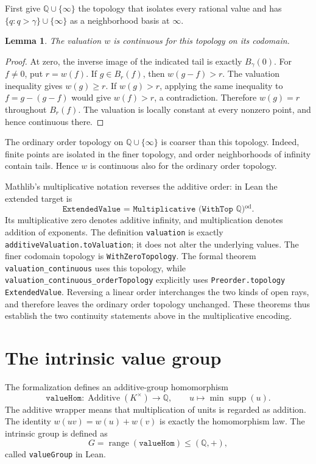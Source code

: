 \documentclass[11pt]{article}
\newtheorem{lemma}{Lemma}
\newcommand{\Q}{\mathbb{Q}}
\begin{document}
First give $\Q\cup\{\infty\}$ the topology that isolates every rational value and has
$\{q:q>\gamma\}\cup\{\infty\}$ as a neighborhood basis at $\infty$.

\begin{lemma}
The valuation $w$ is continuous for this topology on its codomain.
\end{lemma}
\begin{proof}
At zero, the inverse image of the indicated tail is exactly $B_\gamma(0)$.
For $f\ne0$, put $r=w(f)$. If $g\in B_r(f)$, then $w(g-f)>r$.
The valuation inequality gives $w(g)\geq r$. If $w(g)>r$, applying the same inequality to
$f=g-(g-f)$ would give $w(f)>r$, a contradiction. Therefore $w(g)=r$ throughout
$B_r(f)$. The valuation is locally constant at every nonzero point, and hence continuous there.
\end{proof}

The ordinary order topology on $\Q\cup\{\infty\}$ is coarser than this topology.
Indeed, finite points are isolated in the finer topology, and order neighborhoods of infinity
contain tails. Hence $w$ is continuous also for the ordinary order topology.

Mathlib's multiplicative notation reverses the additive order: in Lean the extended target is
\[
 \texttt{ExtendedValue = Multiplicative (WithTop $\Q$)$^{\mathrm{od}}$}.
\]
Its multiplicative zero denotes additive infinity, and multiplication denotes addition of
exponents. The definition \texttt{valuation} is exactly
\texttt{additiveValuation.toValuation}; it does not alter the underlying values.
The finer codomain topology is \texttt{WithZeroTopology}. The formal theorem
\texttt{valuation\_continuous} uses this topology, while
\texttt{valuation\_continuous\_orderTopology} explicitly uses
\texttt{Preorder.topology ExtendedValue}. Reversing a linear order interchanges the two kinds
of open rays, and therefore leaves the ordinary order topology unchanged. These theorems thus
establish the two continuity statements above in the multiplicative encoding.

\section{The intrinsic value group}

The formalization defines an additive-group homomorphism
\[
 \texttt{valueHom}:\operatorname{Additive}(K^\times)\longrightarrow\Q,
 \qquad u\longmapsto \min\operatorname{supp}(u).
\]
The additive wrapper means that multiplication of units is regarded as addition. The identity
$w(uv)=w(u)+w(v)$ is exactly the homomorphism law. The intrinsic group is defined as
\[
 G=\operatorname{range}(\texttt{valueHom})\leq(\Q,+),
\]
called \texttt{valueGroup} in Lean.
\end{document}
